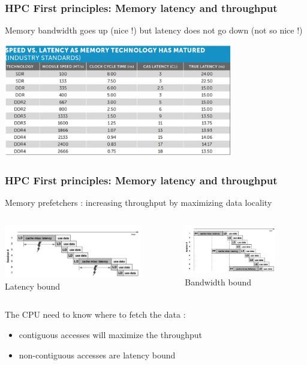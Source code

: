 \begin{frame}[containsverbatim]
\frametitle{HPC First principles: Memory latency and throughput}
Memory bandwidth goes up (nice !) but latency does not go down (not so nice !)
\begin{center}
\includegraphics[width=10cm]{DayGilles/images/memory.jpg}
\end{center}
\end{frame}


\begin{frame}[containsverbatim]
\frametitle{HPC First principles: Memory latency and throughput}
Memory prefetchers : increasing throughput by maximizing data locality
\vfill

\begin{columns}[b]
	\begin{column}{6cm}
	\includegraphics[width=6cm]{DayGilles/images/prefetch-latency.jpg}
	\\
	Latency bound
	\end{column} 
	\begin{column}{4cm}
	\includegraphics[width=4cm]{DayGilles/images/prefetch-bandwidth.jpg}
	\\
	Bandwidth bound
	\end{column}
\end{columns} 
\vfill
The CPU need to know where to fetch the data :
\begin{itemize}
	\item contiguous accesses will maximize the throughput
	\item non-contiguous accesses are latency bound
\end{itemize}
\end{frame}




